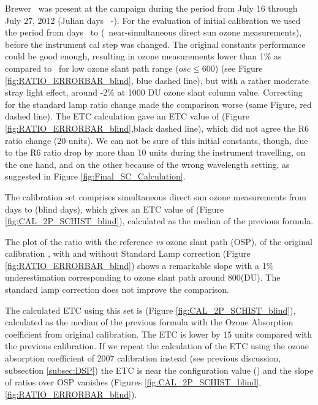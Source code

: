 Brewer \brwname\ was present at the campaign during the period from July 16 through July 27, 2012 (Julian days \CALINI\ -\CALEND). For the evaluation of initial calibration we used the period from days \textbf{\BLINDINI}\ to \textbf{\BLINDEND} (\textbf{\NobsCalblind}\ near-simultaneous direct sun ozone measurements), before the instrument cal step was changed. The original constants performance could be good enough, resulting in ozone measurements lower than 1\% as compared to \brwref\ for low ozone slant path range ($osc\leq600$) (see Figure \ref{fig:RATIO_ERRORBAR_blind}, blue dashed line), but with a rather moderate stray light effect, around -2\% at 1000 DU ozone slant column value. Correcting for the standard lamp ratio change made the comparison worse (same Figure, red dashed line). The ETC calculation gave an ETC value of \textbf{\ETCblind} (Figure \ref{fig:RATIO_ERRORBAR_blind},black dashed line), which did not agree the R6 ratio change (20 units). We can not be sure of this initial constants, though, due to the R6 ratio drop by more than 10 units during the instrument travelling, on the one hand, and on the other because of the wrong wavelength setting, as suggested in Figure \ref{fig:Final_SC_Calculation}.

\vspace{1cm}

The calibration set comprises \textbf{\NobsCalblind} simultaneous direct sun ozone measurements from days \textbf{\BLINDINI} to \textbf{\BLINDEND} (blind days), which gives an ETC value of \textbf{\ETCblind} (Figure \ref{fig:CAL_2P_SCHIST_blind}), calculated as the median of the previous formula.

The plot of the ratio with the reference \emph{vs} ozone slant path (OSP), of the original calibration , with and without Standard Lamp correction (Figure \ref{fig:RATIO_ERRORBAR_blind}) shows a remarkable slope with a 1\% underestimation corresponding to ozone slant path around 800(DU). The standard lamp correction does not improve the comparison.

The calculated ETC using this set is \textbf{\ETCblind} (Figure \ref{fig:CAL_2P_SCHIST_blind}), calculated as the median of the previous formula with the Ozone Absorption coefficient from original calibration. The ETC is lower by 15 units compared with the previous calibration.  If we repeat the calculation of the ETC  using the ozone absorption coefficient of 2007 calibration instead (see previous discussion, subsection \ref{subsec:DSP}) the ETC is near the configuration value (\textbf{\ETCorig}) and the slope of ratios over OSP vanishes (Figures \ref{fig:CAL_2P_SCHIST_blind}, \ref{fig:RATIO_ERRORBAR_blind}).


